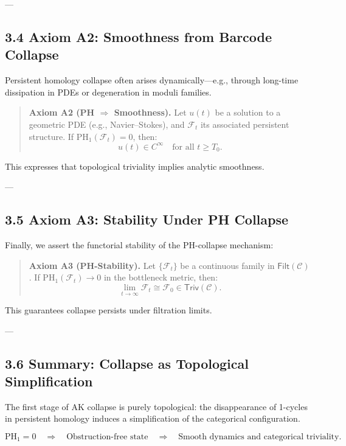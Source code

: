 \documentclass[11pt]{article}
\begin{document}
---

\subsection*{3.4 Axiom A2: Smoothness from Barcode Collapse}

Persistent homology collapse often arises dynamically—e.g., through long-time dissipation in PDEs or degeneration in moduli families.

\begin{quote}
\textbf{Axiom A2 (PH $\Rightarrow$ Smoothness).}  
Let \( u(t) \) be a solution to a geometric PDE (e.g., Navier–Stokes), and \( \mathcal{F}_t \) its associated persistent structure.  
If \( \mathrm{PH}_1(\mathcal{F}_t) = 0 \), then:
\[
u(t) \in C^\infty \quad \text{for all } t \geq T_0.
\]
\end{quote}

This expresses that topological triviality implies analytic smoothness.

---

\subsection*{3.5 Axiom A3: Stability Under PH Collapse}

Finally, we assert the functorial stability of the PH-collapse mechanism:

\begin{quote}
\textbf{Axiom A3 (PH-Stability).}  
Let \( \{ \mathcal{F}_t \} \) be a continuous family in \( \mathsf{Filt}(\mathcal{C}) \).  
If \( \mathrm{PH}_1(\mathcal{F}_t) \to 0 \) in the bottleneck metric, then:
\[
\lim_{t \to \infty} \mathcal{F}_t \cong \mathcal{F}_0 \in \mathsf{Triv}(\mathcal{C}).
\]
\end{quote}

This guarantees collapse persists under filtration limits.

---

\subsection*{3.6 Summary: Collapse as Topological Simplification}

The first stage of AK collapse is purely topological:  
the disappearance of 1-cycles in persistent homology induces a simplification of the categorical configuration.

\[
\mathrm{PH}_1 = 0 
\quad \Longrightarrow \quad 
\text{Obstruction-free state} 
\quad \Longrightarrow \quad 
\text{Smooth dynamics and categorical triviality}.
\]
\end{document}
